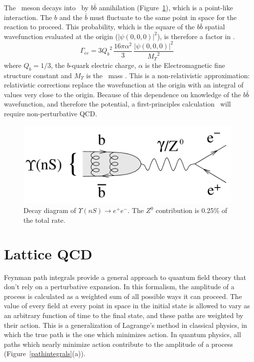 \documentclass{cornell}
\begin{document}
The \ups\ meson decays into \ee\ by $b\bar{b}$ annihilation
(Figure~\ref{diagramgee}), which is a point-like interaction.  The $b$
and the $\bar{b}$ must fluctuate to the same point in space for the
reaction to proceed.  This probability, which is the square of the
$b\bar{b}$ spatial wavefunction evaluated at the origin
($|\psi(0,0,0)|^2$), is therefore a factor in \gee.
\begin{equation}
  \Gamma_{ee} = 3 {Q_b}^2 \, \frac{16 \pi \alpha^2}{3} \, \frac{|\psi(0,0,0)|^2}{{M_\Upsilon}^2}
  \label{eqn:waveatorigin}
\end{equation}
where $Q_b=1/3$, the $b$-quark electric charge, $\alpha$ is the
Electromagnetic fine structure constant and $M_\Upsilon$ is the \ups\
mass \cite{ps}.  This is a non-relativistic approximation:
relativistic corrections replace the wavefunction at the origin with
an integral of values very close to the origin.  Because of this
dependence on knowledge of the $b\bar{b}$ wavefunction, and therefore
the potential, a first-principles calculation \gee\ will require
non-perturbative QCD.

\begin{figure}[p]
  \begin{center}
    \includegraphics[width=0.5\linewidth]{newplots/diagramgee}
  \end{center}
  \caption[Decay diagram of $\Upsilon(nS) \to e^+e^-$]{\label{diagramgee}
  Decay diagram of $\Upsilon(nS) \to e^+e^-$.  The $Z^0$ contribution is
  0.25\% of the total rate.}
\end{figure}

\section{Lattice QCD}

Feynman path integrals provide a general approach to quantum field
theory that don't rely on a perturbative expansion.  In this
formalism, the amplitude of a process is calculated as a weighted sum
of all possible ways it can proceed.  The value of every field at
every point in space in the initial state is allowed to vary as an
arbitrary function of time to the final state, and these paths are
weighted by their action.  This is a generalization of Lagrange's
method in classical physics, in which the true path is the one which
minimizes action.  In quantum physics, all paths which nearly minimize
action contribute to the amplitude of a process (Figure~\ref{pathintegrals}(a)).
\end{document}
